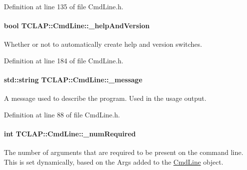 Definition at line 135 of file Cmd\+Line.\+h.

\paragraph[{\texorpdfstring{\+\_\+help\+And\+Version}{_helpAndVersion}}]{\setlength{\rightskip}{0pt plus 5cm}bool T\+C\+L\+A\+P\+::\+Cmd\+Line\+::\+\_\+help\+And\+Version\hspace{0.3cm}{\ttfamily [private]}}\hypertarget{classTCLAP_1_1CmdLine_aea29ec639729a22384ee8759069a5017}{}\label{classTCLAP_1_1CmdLine_aea29ec639729a22384ee8759069a5017}
Whether or not to automatically create help and version switches. 

Definition at line 184 of file Cmd\+Line.\+h.

\paragraph[{\texorpdfstring{\+\_\+message}{_message}}]{\setlength{\rightskip}{0pt plus 5cm}std\+::string T\+C\+L\+A\+P\+::\+Cmd\+Line\+::\+\_\+message\hspace{0.3cm}{\ttfamily [protected]}}\hypertarget{classTCLAP_1_1CmdLine_a3ccd2ae40f6eb97aebca3de9a02f10cf}{}\label{classTCLAP_1_1CmdLine_a3ccd2ae40f6eb97aebca3de9a02f10cf}
A message used to describe the program. Used in the usage output. 

Definition at line 88 of file Cmd\+Line.\+h.

\paragraph[{\texorpdfstring{\+\_\+num\+Required}{_numRequired}}]{\setlength{\rightskip}{0pt plus 5cm}int T\+C\+L\+A\+P\+::\+Cmd\+Line\+::\+\_\+num\+Required\hspace{0.3cm}{\ttfamily [protected]}}\hypertarget{classTCLAP_1_1CmdLine_a2285207b528d5fad18c82a2ee8155f37}{}\label{classTCLAP_1_1CmdLine_a2285207b528d5fad18c82a2ee8155f37}
The number of arguments that are required to be present on the command line. This is set dynamically, based on the Args added to the \hyperlink{classTCLAP_1_1CmdLine}{Cmd\+Line} object. 

